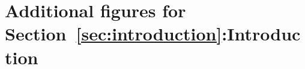     

\ifdefined\ONECOLUMN
\section{Additional figures for Section~\ref{sec:introduction}:Introduction}
\else
